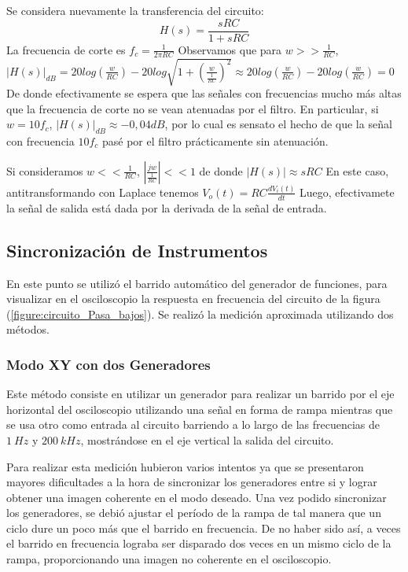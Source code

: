 \documentclass[11pt, a4paper]{article}
\begin{document}
Se considera nuevamente la transferencia del circuito:
\begin{equation*}
    H(s)=\frac{sRC}{1+sRC}
\end{equation*}
La frecuencia de corte es $f_c=\frac{1}{2\pi RC}$ 
Observamos que para $w>>\frac{1}{RC}$, $|H(s)|_{dB}=20log(\frac{w}{RC})-20log\sqrt{1+(\frac{w}{\frac{1}{RC}})^2}\approx20log(\frac{w}{RC})-20log(\frac{w}{RC})=0$ De donde efectivamente se espera que las señales con frecuencias mucho más altas que la frecuencia de corte no se vean atenuadas por el filtro. En particular, si $w=10f_c$, $|H(s)|_{dB}\approx-0,04dB$, por lo cual es sensato el hecho de que la señal con frecuencia $10f_c$ pasé por el filtro prácticamente sin atenuación.

Si consideramos $w<<\frac{1}{RC}$, $|\frac{jw}{\frac{1}{RC}}|<<1$ de donde $|H(s)|\approx sRC$ En este caso, antitransformando con Laplace tenemos $V_o(t)=RC\frac{dV_i(t)}{dt}$ Luego, efectivamete la señal de salida está dada por la derivada de la señal de entrada.




\break
\subsection*{Sincronización de Instrumentos}
En este punto se utilizó el barrido automático del generador de funciones, para visualizar en el osciloscopio la respuesta en frecuencia del circuito de la figura (\ref{figure:circuito_Pasa_bajos}). Se realizó la medición aproximada utilizando dos métodos.

\subsubsection*{Modo XY con dos Generadores}
Este método consiste en utilizar un generador para realizar un barrido por el eje horizontal del osciloscopio utilizando una señal en forma de rampa mientras que se usa otro como entrada al circuito barriendo a lo largo de las frecuencias de $1 \ Hz$ y $200 \ kHz$, mostrándose en el eje vertical la salida del circuito.

Para realizar esta medición hubieron varios intentos ya que se presentaron mayores dificultades a la hora de sincronizar los generadores entre si y lograr obtener una imagen coherente en el modo deseado. Una vez podido sincronizar los generadores, se debió ajustar el período de la rampa de tal manera que un ciclo dure un poco más que el barrido en frecuencia. De no haber sido así, a veces el barrido en frecuencia lograba ser disparado dos veces en un mismo ciclo de la rampa, proporcionando una imagen no coherente en el osciloscopio.
\end{document}
